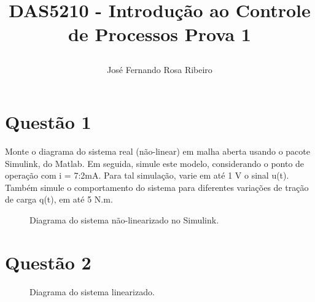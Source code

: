 \documentclass[11pt]{article}
\begin{document}
\author{
José Fernando Rosa Ribeiro
}
\title{DAS5210 - Introdução ao Controle de Processos 
\newline
\newline
\large Prova 1
\date{\vspace{-5ex}}}
\maketitle
\setcounter{secnumdepth}{0}

\section{Questão 1}
Monte o diagrama do sistema real (não-linear) em malha aberta usando o pacote Simulink, do
Matlab. Em seguida, simule este modelo, considerando o ponto de operação com i = 7:2mA. Para
tal simulação, varie em até 1 V o sinal u(t). Também simule o comportamento do sistema para
diferentes variações de tração de carga q(t), em até 5 N.m.

     \begin{figure}[!htb]
        \caption{\label{fig:my-label} Diagrama do sistema não-linearizado no Simulink.}
      \end{figure}
      
      
\section{Questão 2}

     \begin{figure}[!htb]
        \caption{\label{fig:my-label} Diagrama do sistema linearizado.}
      \end{figure}
      
\end{document}
